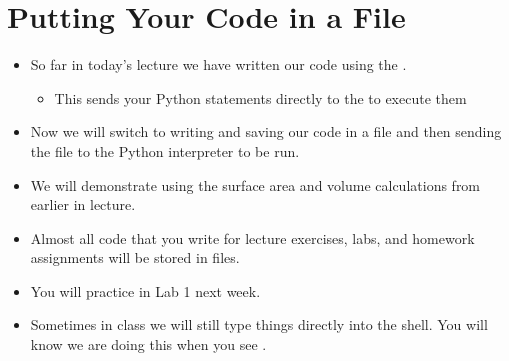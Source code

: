 \documentclass[letterpaper,10pt,english]{sphinxmanual}
\begin{document}
\section{Putting Your Code in a File}
\label{\detokenize{lecture_notes/lec02_calculator:putting-your-code-in-a-file}}\begin{itemize}
\item {} 
So far in today’s lecture we have written our code using the .
\begin{itemize}
\item {} 
This sends your Python statements directly to the  to
execute them

\end{itemize}

\item {} 
Now we will switch to writing and saving our code in a file and then
sending the file to the Python interpreter to be run.

\item {} 
We will demonstrate using the surface area and volume calculations
from earlier in lecture.

\item {} 
Almost all code that you write for lecture exercises, labs, and
homework assignments will be stored in files.

\item {} 
You will practice in Lab 1 next week.

\item {} 
Sometimes in class we will still type things directly into the
shell.  You will know we are doing this when you see \sphinxcode{\sphinxupquote{\textgreater{}\textgreater{}\textgreater{}}}.

\end{itemize}
\end{document}
